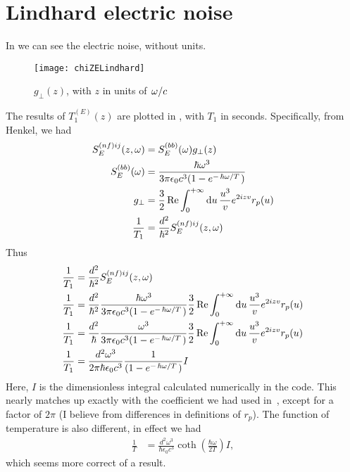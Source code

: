 \documentclass[../main.tex]{subfiles}
\begin{document}
	\section{Lindhard electric noise} \label{sec:ElectricNoise}
	In  we can see the electric noise, without units.
	\begin{figure}[htp]
		\centering
		\texttt{[image: chiZELindhard]}
		\caption{$g_{\perp}(z)$, with $z$ in units of $\flatfrac{\omega}{c}$} \label{fig:chizee}
	\end{figure}

	The results of $T_1^{(E)}(z)$ are plotted in , with $T_1$ in seconds.
	Specifically, from Henkel\supercite{Henkel1999}, we had
	\begin{align}
		S^{(nf)ij}_E(z, \omega) &= S^{(bb)}_E(\omega) g_{\perp}(z) \\
		S^{(bb)}_E(\omega) &= \frac{\hbar \omega^3}{3 \pi \epsilon_0 c^3 (1 - e^{-\flatfrac{\hbar \omega}{T}})} \\
		g_\perp &= \frac32 \Re \int_0^{+\infty} \dd{u} \frac{u^3}{v} e^{2 i z v} r_p(u) \\
		\frac{1}{T_1} &= \frac{d^2}{\hbar^2} S^{(nf)ij}_E(z, \omega)
	\end{align}
	Thus
	\begin{align}
		\frac{1}{T_1} &= \frac{d^2}{\hbar^2} S^{(nf)ij}_E(z, \omega) \\
		\frac{1}{T_1} &= \frac{d^2}{\hbar^2} \frac{\hbar \omega^3}{3 \pi \epsilon_0 c^3 (1 - e^{-\flatfrac{\hbar \omega}{T}})} \frac32 \Re \int_0^{+\infty} \dd{u} \frac{u^3}{v} e^{2 i z v} r_p(u) \\
		\frac{1}{T_1} &= \frac{d^2}{\hbar} \frac{\omega^3}{3 \pi \epsilon_0 c^3 (1 - e^{-\flatfrac{\hbar \omega}{T}})} \frac32 \Re \int_0^{+\infty} \dd{u} \frac{u^3}{v} e^{2 i z v} r_p(u) \\
		\frac{1}{T_1} &= \frac{d^2 \omega^3}{2 \pi \hbar \epsilon_0 c^3} \frac{1}{(1 - e^{-\flatfrac{\hbar \omega}{T}})} I
	\end{align}
	Here, $I$ is the dimensionless integral calculated numerically in the code.
	This nearly matches up exactly with the coefficient we had used in~\cite{QubitRelax}, except for a factor of $2\pi$ (I believe from differences in definitions of $r_p$).
	The function of temperature is also different, in effect we had
	\begin{align}
		\frac{1}{T} &= \frac{d^2 \omega^3}{\hbar \epsilon_0 c^3} \coth(\frac{\hbar \omega}{2 T}) I, \label{eq:actualTime}
	\end{align}
	which seems more correct of a result.
\end{document}
